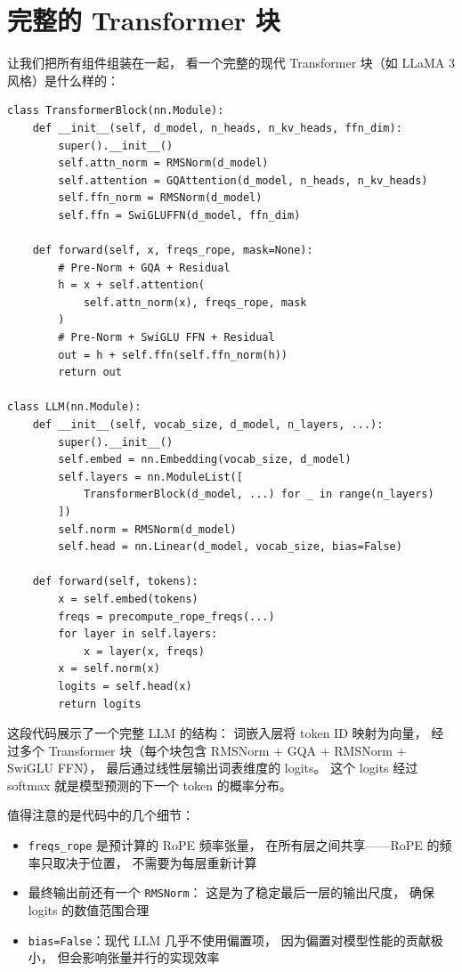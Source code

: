 \section{完整的 Transformer 块}

让我们把所有组件组装在一起，
看一个完整的现代 Transformer 块（如 LLaMA 3 风格）是什么样的：

\begin{lstlisting}[caption={A complete modern Transformer block}]
class TransformerBlock(nn.Module):
    def __init__(self, d_model, n_heads, n_kv_heads, ffn_dim):
        super().__init__()
        self.attn_norm = RMSNorm(d_model)
        self.attention = GQAttention(d_model, n_heads, n_kv_heads)
        self.ffn_norm = RMSNorm(d_model)
        self.ffn = SwiGLUFFN(d_model, ffn_dim)

    def forward(self, x, freqs_rope, mask=None):
        # Pre-Norm + GQA + Residual
        h = x + self.attention(
            self.attn_norm(x), freqs_rope, mask
        )
        # Pre-Norm + SwiGLU FFN + Residual
        out = h + self.ffn(self.ffn_norm(h))
        return out

class LLM(nn.Module):
    def __init__(self, vocab_size, d_model, n_layers, ...):
        super().__init__()
        self.embed = nn.Embedding(vocab_size, d_model)
        self.layers = nn.ModuleList([
            TransformerBlock(d_model, ...) for _ in range(n_layers)
        ])
        self.norm = RMSNorm(d_model)
        self.head = nn.Linear(d_model, vocab_size, bias=False)

    def forward(self, tokens):
        x = self.embed(tokens)
        freqs = precompute_rope_freqs(...)
        for layer in self.layers:
            x = layer(x, freqs)
        x = self.norm(x)
        logits = self.head(x)
        return logits
\end{lstlisting}

这段代码展示了一个完整 LLM 的结构：
词嵌入层将 token ID 映射为向量，
经过多个 Transformer 块（每个块包含 RMSNorm + GQA + RMSNorm + SwiGLU FFN），
最后通过线性层输出词表维度的 logits。
这个 logits 经过 softmax 就是模型预测的下一个 token 的概率分布。

值得注意的是代码中的几个细节：
\begin{itemize}[noitemsep]
  \item \texttt{freqs\_rope} 是预计算的 RoPE 频率张量，
        在所有层之间共享——RoPE 的频率只取决于位置，
        不需要为每层重新计算
  \item 最终输出前还有一个 \texttt{RMSNorm}：
        这是为了稳定最后一层的输出尺度，
        确保 logits 的数值范围合理
  \item \texttt{bias=False}：现代 LLM 几乎不使用偏置项，
        因为偏置对模型性能的贡献极小，
        但会影响张量并行的实现效率
\end{itemize}

